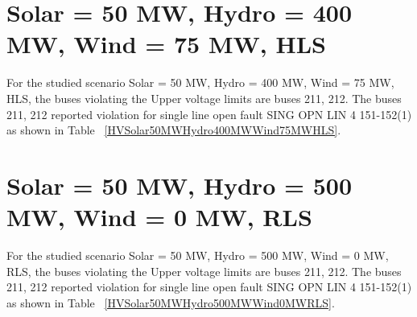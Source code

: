 \documentclass[10pt]{report}
\begin{document}
\section{Solar = 50 MW, Hydro = 400 MW, Wind = 75 MW, HLS}
For the studied scenario Solar = 50 MW, Hydro = 400 MW, Wind = 75 MW, HLS, the buses violating the Upper voltage limits are buses 211, 212.
The buses 211, 212 reported violation for single line open fault SING OPN LIN   4 151-152(1) as shown in Table ~\ref{HVSolar50MWHydro400MWWind75MWHLS}.
\begin{table}[H]
\caption{Contingencies reporting bus voltages greater than emergency voltage of 1.1 PU for scenario Solar = 50 MW, Hydro = 400 MW, Wind = 75 MW, HLS}
\label{HVSolar50MWHydro400MWWind75MWHLS}
\centering
{}
\end{table}


\section{Solar = 50 MW, Hydro = 500 MW, Wind = 0 MW, RLS}
For the studied scenario Solar = 50 MW, Hydro = 500 MW, Wind = 0 MW, RLS, the buses violating the Upper voltage limits are buses 211, 212.
The buses 211, 212 reported violation for single line open fault SING OPN LIN   4 151-152(1) as shown in Table ~\ref{HVSolar50MWHydro500MWWind0MWRLS}.
\begin{table}[H]
\caption{Contingencies reporting bus voltages greater than emergency voltage of 1.1 PU for scenario Solar = 50 MW, Hydro = 500 MW, Wind = 0 MW, RLS}
\label{HVSolar50MWHydro500MWWind0MWRLS}
\centering
{}
\end{table}
\end{document}
